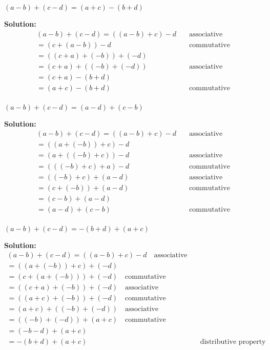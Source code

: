 \begin{tcolorbox}[title=Problem 4, breakable]
$(a - b) + (c - d) = (a + c) - (b + d)$
\end{tcolorbox}

\textbf{Solution:}
\begin{align*}
(a - b) + (c - d) = ((a - b) + c) - d  & \quad \text{associative} \\
=(c + (a - b)) - d  & \quad \text{commutative} \\
=((c + a) + (-b)) + (-d) & \quad \text{} \\
=(c + a) + ((-b) + (-d))  & \quad \text{associative} \\
=(c + a) - (b + d) & \quad \text{} \\
=(a + c) - (b + d) & \quad \text{commutative} \\
\end{align*}

\begin{tcolorbox}[title=Problem 5, breakable]
$(a - b) + (c - d) = (a - d) + (c - b)$
\end{tcolorbox}

\textbf{Solution:}
\begin{align*}
(a - b) + (c - d) = ((a - b) + c) - d & \quad \text{associative} \\
=((a + (-b)) + c) - d  & \quad \text{} \\
=(a + ((-b) + c)) - d & \quad \text{associative} \\
=(((-b) + c) + a) - d & \quad \text{commutative} \\
=((-b) + c) + (a - d) & \quad \text{associative} \\
=(c + (-b)) + (a - d) & \quad \text{commutative} \\
=(c - b) + (a - d) & \quad \text{} \\
=(a - d) + (c - b) & \quad \text{commutative} \\
\end{align*}

\begin{tcolorbox}[title=Problem 6, breakable]
$(a - b) + (c - d) = -(b + d) + (a + c)$
\end{tcolorbox}

\textbf{Solution:}
\begin{align*}
(a - b) + (c - d) = ((a - b) + c) - d \quad \text{associative} \\
=((a + (-b)) + c) + (-d)  & \quad \text{} \\
=(c + (a + (-b))) + (-d) \quad \text{commutative} \\
=((c + a) + (-b)) + (-d) \quad \text{associative} \\
=((a + c) + (-b)) + (-d) \quad \text{commutative} \\
=(a + c) + ((-b) + (-d)) \quad \text{associative} \\
=((-b) + (-d)) + (a + c) \quad \text{commutative} \\
=(-b - d) + (a + c)  & \quad \text{} \\
=-(b + d) + (a + c)  & \quad \text{distributive property} \\
\end{align*}


